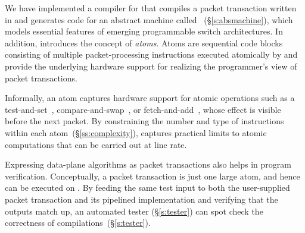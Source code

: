 We have implemented a compiler for \pktlanguage that compiles a packet
transaction written in \pktlanguage and generates code for an abstract machine
called \absmachine~(\S\ref{s:absmachine}), which models essential features of
emerging programmable switch architectures.  In addition, \absmachine
introduces the concept of {\em atoms}. Atoms are sequential code blocks
consisting of multiple packet-processing instructions executed atomically by
\absmachine and provide the underlying hardware support for realizing the
programmer's view of packet transactions.

Informally, an atom captures hardware support for atomic operations such as a
test-and-set~\cite{tas}, compare-and-swap~\cite{cas}, or
fetch-and-add~\cite{faa}, whose effect is visible before the next packet. By
constraining the number and type of instructions within each
atom~(\S\ref{ss:complexity}), \absmachine captures practical limits to atomic
computations that can be carried out at line rate.



Expressing data-plane algorithms as packet transactions also helps in program
verification.  Conceptually, a packet transaction is just one large atom, and
hence can be executed on \absmachine.  By feeding the same test input to both
the user-supplied packet transaction and its pipelined implementation and
verifying that the outputs match up, an automated tester (\S\ref{s:tester}) can
spot check the correctness of compilations~(\S\ref{s:tester}).

